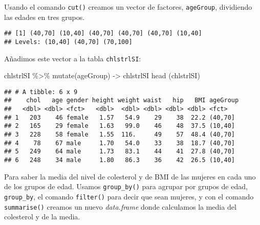 \documentclass[
]{article}
\newenvironment{Shaded}{\begin{snugshade}}{\end{snugshade}}
\newcommand{\AttributeTok}[1]{\textcolor[rgb]{0.77,0.63,0.00}{#1}}
\newcommand{\DecValTok}[1]{\textcolor[rgb]{0.00,0.00,0.81}{#1}}
\newcommand{\FunctionTok}[1]{\textcolor[rgb]{0.00,0.00,0.00}{#1}}
\newcommand{\NormalTok}[1]{#1}
\newcommand{\OtherTok}[1]{\textcolor[rgb]{0.56,0.35,0.01}{#1}}
\newcommand{\SpecialCharTok}[1]{\textcolor[rgb]{0.00,0.00,0.00}{#1}}
\begin{document}
Usando el comando \texttt{cut()} creamos un vector de factores,
\texttt{ageGroup}, dividiendo las edades en tres grupos.

\begin{Shaded}
\end{Shaded}

\begin{verbatim}
## [1] (40,70] (10,40] (40,70] (40,70] (40,70] (10,40]
## Levels: (10,40] (40,70] (70,100]
\end{verbatim}

Añadimos este vector a la tabla \texttt{chlstrlSI}:

\begin{Shaded}
\begin{Highlighting}[]
\NormalTok{chlstrlSI }\SpecialCharTok{\%\textgreater{}\%} \FunctionTok{mutate}\NormalTok{(ageGroup) }\OtherTok{{-}\textgreater{}}\NormalTok{ chlstrlSI}
\FunctionTok{head}\NormalTok{ (chlstrlSI)}
\end{Highlighting}
\end{Shaded}

\begin{verbatim}
## # A tibble: 6 x 9
##    chol   age gender height weight waist   hip   BMI ageGroup
##   <dbl> <dbl> <fct>   <dbl>  <dbl> <dbl> <dbl> <dbl> <fct>   
## 1   203    46 female   1.57   54.9    29    38  22.2 (40,70] 
## 2   165    29 female   1.63   99.0    46    48  37.5 (10,40] 
## 3   228    58 female   1.55  116.     49    57  48.4 (40,70] 
## 4    78    67 male     1.70   54.0    33    38  18.7 (40,70] 
## 5   249    64 male     1.73   83.1    44    41  27.8 (40,70] 
## 6   248    34 male     1.80   86.3    36    42  26.5 (10,40]
\end{verbatim}

Para saber la media del nivel de colesterol y de BMI de las mujeres en
cada uno de los grupos de edad. Usamos \texttt{group\_by()} para agrupar
por grupos de edad, \texttt{group\_by}, el comando \texttt{filter()}
para decir que sean mujeres, y con el comando \texttt{summarise()}
creamos un nuevo \emph{data.frame} donde calculamos la media del
colesterol y de la media.
\end{document}
